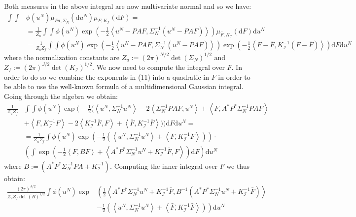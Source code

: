 \documentclass{article}
\theoremstyle{definition}
\theoremstyle{remark}
\begin{document}
Both measures in the above integral are now multivariate normal and so we have:
\begin{align}
    \int\int&\phi(u^{N})\mu_{Pa,\Sigma_N}(\mathrm{d}u^{N})\mu_{\bar{F},K_{\mathcal{I}}}(\mathrm{d}F)= \nonumber \\ &=\frac{1}{Z_u}\int\int\phi(u^{N})\exp\left(-\frac{1}{2}\left\langle u^{N}-PAF,\Sigma_{N}^{-1}(u^{N}-PAF) \right\rangle\right)\mu_{\bar{F},K_{\mathcal{I}}}(\mathrm{d}F)\mathrm{d}u^{N} \nonumber \\
    &=\frac{1}{Z_{u}Z_{f}}\int\int\phi(u^{N})\exp\left(-\frac{1}{2}\left\langle u^{N}-PAF,\Sigma_{N}^{-1}(u^{N}-PAF)\right\rangle\right)\exp\left(-\frac{1}{2}\left\langle F-\bar{F},K_{\mathcal{I}}^{-1}(F-\bar{F}) \right\rangle\right)\mathrm{d}F\mathrm{d}u^{N}
\end{align}
where the normalization constants are $Z_u:=(2\pi)^{N/2}\det(\Sigma_N)^{1/2}$ and $Z_f:=(2\pi)^{J/2}\det(K_\mathcal{I})^{1/2}$. We now need to compute the integral over $F$. In order to do so we combine the exponents in (11) into a quadratic in $F$ in order to be able to use the well-known formula of a multidimensional Gaussian integral. Going through the algebra we obtain:
\begin{align}
    \frac{1}{Z_{u}Z_{f}}&\int\int\phi(u^{N})\exp\Bigg(-\frac{1}{2}\Big(\left\langle u^{N},\Sigma_{N}^{-1}u^{N} \right\rangle - 2\left\langle \Sigma_{N}^{-1}PAF,u^{N}\right\rangle + \left\langle F,A^{*}P^{*}\Sigma_{N}^{-1}PAF\right\rangle \nonumber \\
    &+ \left\langle F,K_{\mathcal{I}}^{-1}F\right\rangle - 2 \left\langle K_{\mathcal{I}}^{-1}\bar{F},F \right\rangle + \left\langle \bar{F},K_{\mathcal{I}}^{-1}\bar{F}\right\rangle \Big)\Bigg)\mathrm{d}F\mathrm{d}u^{N} = \nonumber \\
    &=\frac{1}{Z_{u}Z_{f}}\int\phi(u^{N})\exp\left(-\frac{1}{2}\left(\left\langle u^{N},\Sigma_{N}^{-1} u^{N} \right\rangle + \left\langle \bar{F},K_{\mathcal{I}}^{-1}\bar{F} \right\rangle\right)\right) \cdot \nonumber \\
    &\left(\int\exp\left(-\frac{1}{2}\left\langle F,BF \right\rangle + \left\langle A^{*}P^{*}\Sigma_{N}^{-1}u^{N} + K_{\mathcal{I}}^{-1}\bar{F},F \right\rangle\right)\mathrm{d}F\right)\mathrm{d}u^{N}
\end{align}
where $B:=\left(A^{*}P^{*}\Sigma_{N}^{-1}PA+K_{\mathcal{I}}^{-1}\right)$. Computing the inner integral over $F$ we thus obtain:
\begin{align}
    \frac{(2\pi)^{J/2}}{Z_{u}Z_{f}\det(B)^{1/2}}\int\phi(u^{N})\exp&\left(\frac{1}{2}\left\langle A^{*}P^{*}\Sigma_{N}^{-1}u^{N} + K_{\mathcal{I}}^{-1}\bar{F}, B^{-1}\left(A^{*}P^{*}\Sigma_{N}^{-1}u^{N} + K_{\mathcal{I}}^{-1}\bar{F}\right) \right\rangle\right. \nonumber \\
    &\left.-\frac{1}{2}\left(\left\langle u^{N}, \Sigma_{N}^{-1}u^{N}\right\rangle + \left\langle \bar{F},K_{\mathcal{I}}^{-1}\bar{F} \right\rangle \right)\right)\mathrm{d}u^{N}
\end{align}
\end{document}
